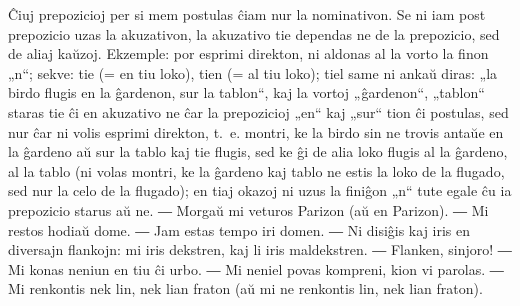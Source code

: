 
Ĉiuj prepozicioj per si mem postulas ĉiam nur la nominativon. Se ni iam post prepozicio uzas la akuzativon, la akuzativo tie dependas ne de la prepozicio, sed de aliaj kaŭzoj. Ekzemple: por esprimi direkton, ni aldonas al la vorto la finon „n“; sekve: tie (= en tiu loko), tien (= al tiu loko); tiel same ni ankaŭ diras: „la birdo flugis en la ĝardenon, sur la tablon“, kaj la vortoj „ĝardenon“, „tablon“ staras tie ĉi en akuzativo ne ĉar la prepozicioj „en“ kaj „sur“ tion ĉi postulas, sed nur ĉar ni volis esprimi direkton, t.~e. montri, ke la birdo sin ne trovis antaŭe en la ĝardeno aŭ sur la tablo kaj tie flugis, sed ke ĝi de alia loko flugis al la ĝardeno, al la tablo (ni volas montri, ke la ĝardeno kaj tablo ne estis la loko de la flugado, sed nur la celo de la flugado); en tiaj okazoj ni uzus la finiĝon „n“ tute egale ĉu ia prepozicio starus aŭ ne. ― Morgaŭ mi veturos Parizon (aŭ en Parizon). ― Mi restos hodiaŭ dome. ― Jam estas tempo iri domen. ― Ni disiĝis kaj iris en diversajn flankojn: mi iris dekstren, kaj li iris maldekstren. ― Flanken, sinjoro! ― Mi konas neniun en tiu ĉi urbo. ― Mi neniel povas kompreni, kion vi parolas. ― Mi renkontis nek lin, nek lian fraton (aŭ mi ne renkontis lin, nek lian fraton).

